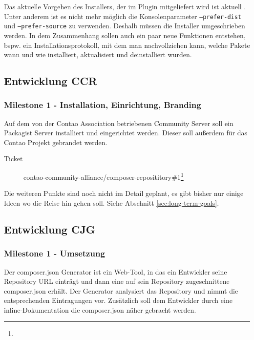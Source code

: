 \documentclass[
paper=a4,
draft=false,%
fontsize=10pt%
]{scrartcl}
\begin{document}
Das aktuelle Vorgehen des Installers, der im Plugin mitgeliefert wird ist aktuell . Unter anderem ist es nicht mehr möglich die Konsolenparameter \texttt{--prefer-dist} und \texttt{--prefer-source} zu verwenden. Deshalb müssen die Installer umgeschrieben werden. In dem Zusammenhang sollen auch ein paar neue Funktionen entstehen, bspw. ein Installationsprotokoll, mit dem man nachvollziehen kann, welche Pakete wann und wie installiert, aktualisiert und deinstalliert wurden.

\subsection{Entwicklung CCR}
\label{subsec:ccr}

\subsubsection{Milestone 1 - Installation, Einrichtung, Branding}
\label{subsec:ccr-milestone-1}

Auf dem von der Contao Association betriebenen Community Server soll ein Packagist Server installiert und eingerichtet werden. Dieser soll außerdem für das Contao Projekt gebrandet werden.

\begin{description}
\item[Ticket] contao-community-alliance/composer-reposititory\#1\footnote{}
\end{description}

Die weiteren Punkte sind noch nicht im Detail geplant, es gibt bisher nur einige Ideen wo die Reise hin gehen soll. Siehe Abschnitt \ref{sec:long-term-goals}.

\subsection{Entwicklung CJG}
\label{subsec:cjg}

\subsubsection{Milestone 1 - Umsetzung}
\label{subsec:cjg-milestone-1}

Der composer.json Generator ist ein Web-Tool, in das ein Entwickler seine Repository URL einträgt und dann eine auf sein Repository zugeschnittene composer.json erhält. Der Generator analysiert das Repository und nimmt die entsprechenden Eintragungen vor. Zusätzlich soll dem Entwickler durch eine inline-Dokumentation die composer.json näher gebracht werden.
\end{document}
